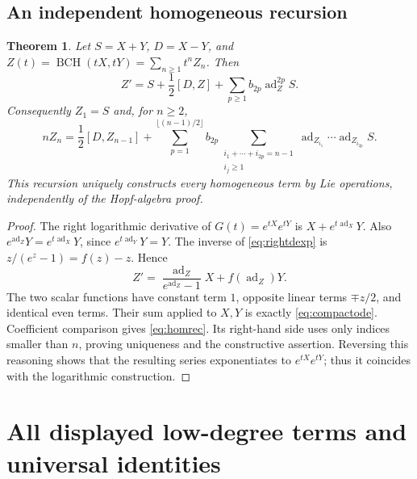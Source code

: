 \documentclass[11pt]{article}
\numberwithin{equation}{section}
\newtheorem{theorem}{Theorem}[section]
\theoremstyle{definition}
\theoremstyle{remark}
\DeclareMathOperator{\ad}{ad}
\DeclareMathOperator{\BCH}{BCH}
\begin{document}
\subsection{An independent homogeneous recursion}
\begin{theorem}\label{thm:homrec}
Let $S=X+Y$, $D=X-Y$, and
$Z(t)=\BCH(tX,tY)=\sum_{n\geq1}t^n Z_n$. Then
\begin{equation}\label{eq:compactode}
 Z'=S+\frac12[D,Z]
       +\sum_{p\geq1}b_{2p}\ad_Z^{2p}S.
\end{equation}
Consequently $Z_1=S$ and, for $n\geq2$,
\begin{equation}\label{eq:homrec}
 nZ_n=\frac12[D,Z_{n-1}]
 +\sum_{p=1}^{\lfloor(n-1)/2\rfloor}b_{2p}
 \sum_{\substack{i_1+\cdots+i_{2p}=n-1\\i_j\geq1}}
 \ad_{Z_{i_1}}\cdots\ad_{Z_{i_{2p}}}S.
\end{equation}
This recursion uniquely constructs every homogeneous term by Lie
operations, independently of the Hopf-algebra proof.
\end{theorem}
\begin{proof}
The right logarithmic derivative of $G(t)=e^{tX}e^{tY}$ is
$X+e^{t\ad_X}Y$. Also $e^{\ad_Z}Y=e^{t\ad_X}Y$, since
$e^{t\ad_Y}Y=Y$. The inverse of \eqref{eq:rightdexp} is
$z/(e^z-1)=f(z)-z$. Hence
\[
 Z'=\frac{\ad_Z}{e^{\ad_Z}-1}X+f(\ad_Z)Y.
\]
The two scalar functions have constant term $1$, opposite linear
terms $\mp z/2$, and identical even terms. Their sum applied to $X,Y$
is exactly \eqref{eq:compactode}. Coefficient comparison gives
\eqref{eq:homrec}. Its right-hand side uses only indices smaller than
$n$, proving uniqueness and the constructive assertion. Reversing
this reasoning shows that the resulting series exponentiates to
$e^{tX}e^{tY}$; thus it coincides with the logarithmic construction.
\end{proof}

\section{All displayed low-degree terms and universal identities}
\label{sec:lowdegree}
\end{document}
